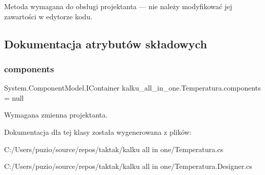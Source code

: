Metoda wymagana do obsługi projektanta — nie należy modyfikować jej zawartości w edytorze kodu. 



\subsection{Dokumentacja atrybutów składowych}
\mbox{\label{classkalku__all__in__one_1_1_temperatura_ad71ec6a4400ab643b5367db27476886a}} 
\subsubsection{\texorpdfstring{components}{components}}
{\footnotesize\ttfamily System.\+Component\+Model.\+I\+Container kalku\+\_\+all\+\_\+in\+\_\+one.\+Temperatura.\+components = null\hspace{0.3cm}{\ttfamily [private]}}



Wymagana zmienna projektanta. 



Dokumentacja dla tej klasy została wygenerowana z plików\+:\begin{DoxyCompactItemize}
\item 
C\+:/\+Users/puzio/source/repos/taktak/kalku all in one/Temperatura.\+cs\item 
C\+:/\+Users/puzio/source/repos/taktak/kalku all in one/Temperatura.\+Designer.\+cs\end{DoxyCompactItemize}
